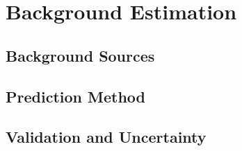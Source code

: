 \chapter{Background Estimation}

\label{ch:background}

\section{Background Sources}


\section{Prediction Method}


\section{Validation and Uncertainty}

